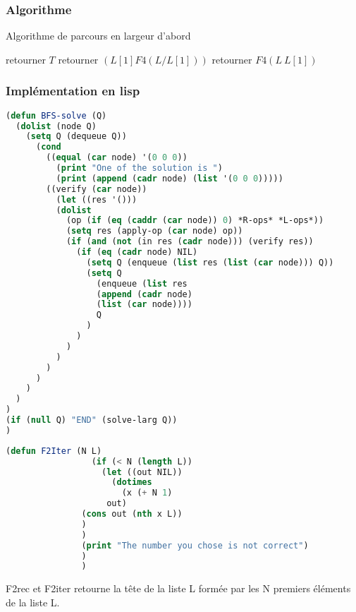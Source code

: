 \documentclass[a4paper, 12pt, leqno]{report}
\theoremstyle{plain}
\begin{document}
            \subsubsection{Algorithme}
            \begin{algorithm}
            \caption{Algorithme de parcours en largeur d'abord}
            \begin{algorithmic}
                \State retourner $T$
                     \State retourner $(L[1] F4(L / L[1]))$
            \Else                   
                    \State retourner $F4(L \ L[1])$
            \EndIf   
   
            \end{algorithmic}
            \end{algorithm}  
            \subsubsection{Implémentation en lisp}
            \begin{lstlisting}[label=some-code,caption=BFS-solve (N L) version largeur d'abord,language=lisp]
(defun BFS-solve (Q)
  (dolist (node Q)
    (setq Q (dequeue Q))
      (cond 
	    ((equal (car node) '(0 0 0)) 
	      (print "One of the solution is ") 
	      (print (append (cadr node) (list '(0 0 0)))))  
	    ((verify (car node)) 
	      (let ((res '()))
	      (dolist 
	        (op (if (eq (caddr (car node)) 0) *R-ops* *L-ops*))
	        (setq res (apply-op (car node) op))
	        (if (and (not (in res (cadr node))) (verify res))
              (if (eq (cadr node) NIL)	
	            (setq Q (enqueue (list res (list (car node))) Q))
	            (setq Q 
	              (enqueue (list res 
	              (append (cadr node) 
	              (list (car node)))) 
	              Q
	            )
	          )
	        )
	      )	
	    )
	  )
	)
  )
)
(if (null Q) "END" (solve-larg Q))	
)
            \end{lstlisting}
          
            \begin{lstlisting}[label=some-code,caption=F2 (N L) version itérative,language=lisp]
               (defun F2Iter (N L)
	             (if (< N (length L))
		           (let ((out NIL))
			         (dotimes 
			           (x (+ N 1)
			        out)
		       (cons out (nth x L))
			   )
		       )
		       (print "The number you chose is not correct")
	           )
               )
            \end{lstlisting}        
F2rec et F2iter retourne la tête de la liste L formée par les N premiers éléments de la liste L.
            
\end{document}
